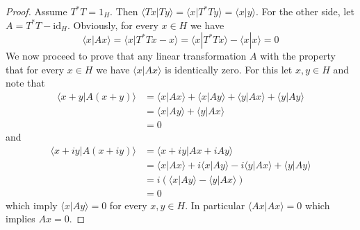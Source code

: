 \documentclass[12pt]{article}
\theoremstyle{definition}
\theoremstyle{remark}
\begin{document}
    \begin{proof}
        Assume $T^*T=1_H$. Then $\langle Tx|Ty \rangle = \langle x |T^*Ty \rangle = \langle x|y \rangle$. For the other side, let $A=T^*T-\text{id}_H$. Obviously, for every $x\in H$ we have
        $$
        \langle x | Ax \rangle = \langle x | T^*Tx - x \rangle = \langle x | T^*Tx \rangle - \langle x | x \rangle = 0
        $$
        We now proceed to prove that any linear transformation $A$ with the property that for every $x\in H$ we have $\langle x | Ax \rangle$ is identically zero. For this let $x,y\in H$ and note that
        \begin{align*}
            \langle x+y | A(x+y) \rangle &= \langle x | Ax \rangle + \langle x | Ay \rangle + \langle y | Ax \rangle + \langle y | Ay \rangle \\
            &= \langle x | Ay \rangle + \langle y | Ax \rangle \\
            &= 0
        \end{align*}
        and
        \begin{align*}
            \langle x + iy | A(x + iy) \rangle &= \langle x + iy | Ax + iAy \rangle \\
            &= \langle x | Ax \rangle + i \langle x | Ay \rangle - i \langle y | Ax \rangle + \langle y | Ay \rangle \\
            &= i (\langle x | Ay \rangle - \langle y | Ax \rangle) \\
            &= 0
        \end{align*}
        which imply $\langle x|Ay \rangle = 0$ for every $x,y\in H$. In particular $\langle Ax|Ax \rangle = 0$ which implies $Ax = 0$.
        
    \end{proof}

    \printbibliography
\end{document}
